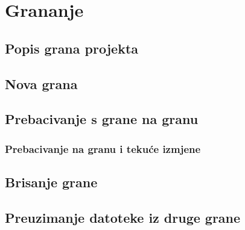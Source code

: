 \chapter*{Grananje}



\section*{Popis grana projekta}







\section*{Nova grana}










\section*{Prebacivanje s grane na granu}









\subsection*{Prebacivanje na granu i tekuće izmjene}

\section*{Brisanje grane}









\section*{Preuzimanje datoteke iz druge grane}


